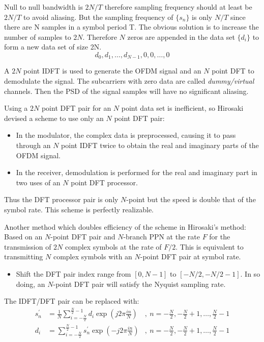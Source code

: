 Null to null bandwidth is $2N/T$ therefore sampling frequency should at least be $2N/T$ to avoid \gls{aliasing}. But the sampling frequency of $\{ s_n\}$ is only $N/T$ since there are N samples in a symbol period T. The obvious solution is to increase the number of samples to $2N$. Therefore $N$ zeros are appended in the data set $\{ d_i\}$ to form a new data set of size 2N.
$$d_0,d_1,\ldots,d_{N-1}, 0,0,\ldots,0$$

A $2N$ point \gls{IDFT} is used to generate the OFDM signal and an $N$ point \gls{DFT} to demodulate the signal. The subcarriers with zero data are called \textit{dummy/virtual} channels. Then the PSD of the signal samples will have no significant \gls{aliasing}.

Using a $2N$ point \gls{DFT} pair for an $N$ point data set is inefficient, so Hirosaki\cite{hirosaki} devised a scheme to use only an $N$ point \gls{DFT} pair:
\begin{itemize}
	\item In the modulator, the complex data is preprocessed, causing it to pass through an $N$ point \gls{IDFT} twice to obtain the real and imaginary parts of the OFDM signal.
	\item In the receiver, demodulation is performed for the real and imaginary part in two uses of an $N$ point \gls{DFT} processor.
\end{itemize}
Thus the \gls{DFT} processor pair is only $N$-point but the speed is double that of the symbol rate. This scheme is perfectly realizable\cite{hirosaki}.

Another method which doubles efficiency of the scheme in Hirosaki's method: Based on an $N$-point \gls{DFT} pair and $N$-branch PPN at the rate $F$ for the transmission of $2N$ complex symbols at the rate of $F/2$. This is equivalent to transmitting $N$ complex symbols with an $N$-point \gls{DFT} pair at symbol rate.
\begin{itemize}
	\item Shift the \gls{DFT} pair index range from $[0,N-1]$ to $[-N/2, -N/2-1]$. In so doing, an $N$-point \gls{DFT} pair will satisfy the Nyquist sampling rate.
\end{itemize}

The \gls{IDFT}/\gls{DFT} pair can be replaced with:
\begin{align*}
s_n^\prime &= \frac{1}{N}\sum_{i=-\frac{N}{2}}^{\frac{N}{2}-1}d_i\exp\left( j2\pi\frac{in}{N}\right)&,\ n = -\frac{N}{2},-\frac{N}{2}+1,\ldots,\frac{N}{2}-1\\
d_i &= \sum_{i=-\frac{N}{2}}^{\frac{N}{2}-1}s_n^\prime\exp\left( -j2\pi\frac{in}{N}\right)&,\ n = -\frac{N}{2},-\frac{N}{2}+1,\ldots,\frac{N}{2}-1\\
\end{align*}

